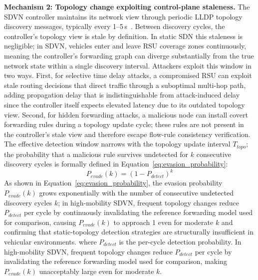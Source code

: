 \documentclass[12pt, a4paper]{report}
\begin{document}
\textbf{Mechanism 2: Topology change exploiting control-plane
staleness.}
The SDVN controller maintains its network view through periodic LLDP
topology discovery messages, typically every 1--5\,s~\cite{Wang2020Topology}.
Between discovery cycles, the controller's topology view is stale by
definition. In static SDN this staleness is negligible; in SDVN,
vehicles enter and leave RSU coverage zones continuously, meaning the
controller's forwarding graph can diverge substantially from the true
network state within a single discovery interval. Attackers exploit
this window in two ways. First, for selective time delay attacks,
a compromised RSU can exploit stale routing decisions that direct
traffic through a suboptimal multi-hop path, adding propagation delay
that is indistinguishable from attack-induced delay since the
controller itself expects elevated latency due to its outdated topology
view. Second, for hidden forwarding attacks, a malicious node can
install covert forwarding rules during a topology update cycle; these
rules are not present in the controller's stale view and therefore
escape flow-rule consistency verification. The effective detection
window narrows with the topology update interval $T_{topo}$; the
probability that a malicious rule survives undetected for $k$
consecutive discovery cycles is formally defined in
Equation~\eqref{eq:evasion_probability}:
\begin{equation}
P_{evade}(k) = \left(1 - P_{detect}\right)^k
\label{eq:evasion_probability}
\end{equation}
As shown in Equation~\eqref{eq:evasion_probability}, the
evasion probability $P_{evade}(k)$ grows exponentially with the
number of consecutive undetected discovery cycles $k$; in
high-mobility SDVN, frequent topology changes reduce $P_{detect}$
per cycle by continuously invalidating the reference forwarding model
used for comparison, causing $P_{evade}(k)$ to approach 1 even for
moderate $k$ and confirming that static-topology detection strategies
are structurally insufficient in vehicular environments.
where $P_{detect}$ is the per-cycle detection probability. In high-mobility
SDVN, frequent topology changes reduce $P_{detect}$ per cycle by
invalidating the reference forwarding model used for comparison,
making $P_{evade}(k)$ unacceptably large even for moderate $k$.
\end{document}
